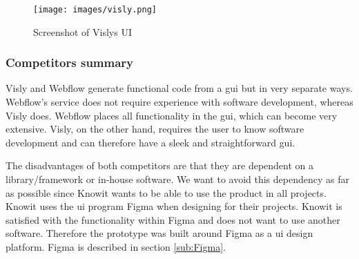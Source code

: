 \begin{figure}[H]
  \centering
  \texttt{[image: images/visly.png]}
  \caption{ Screenshot of Vislys UI }%
  \label{fig:visly}
\end{figure}







\subsubsection{Competitors summary}%
\label{ssub:Comparison}
Visly and Webflow generate functional code from a \acrfull{gui} but in very separate ways. Webflow's service does not require experience with software development, whereas Visly does. Webflow places all functionality in the \acrshort{gui}, which can become very extensive. Visly, on the other hand, requires the user to know software development and can therefore have a sleek and straightforward \acrshort{gui}.

The disadvantages of both competitors are that they are dependent on a library/framework or in-house software. We want to avoid this dependency as far as possible since Knowit wants to be able to use the product in all projects. Knowit uses the \acrshort{ui} program Figma when designing  for their projects. Knowit is satisfied with the functionality within Figma and does not want to use another software. Therefore the prototype was built around Figma as a \acrshort{ui} design platform. Figma is described in section \ref{sub:Figma}.



